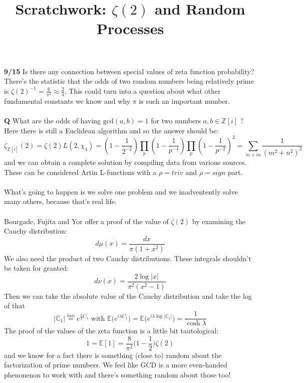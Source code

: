\documentclass[12pt]{article}
\title{Scratchwork: $\zeta(2)$ and Random Processes}
\date{}
\begin{document}
\sffamily

\maketitle

\noindent \textbf{9/15} Is there any connection between special values of zeta function probability?  There's the statistic that the odds of two random numbers being relatively prime is $\zeta(2)^{-1} = \frac{6}{\pi^2} \approx \frac{2}{3}$.  This could turn into a question about what other fundamental constants we know and why $\pi$ is such an important number. \\ \\
\textbf{Q} What are the odds of having $\text{gcd}(a,b) = 1$ for two numbers $a,b \in \mathbb{Z}[i]$ ?  Here there is still a Euclidean algorithm and so the answer should be:
$$ \zeta_{\mathbb{Z}[i]} (2) =  \zeta(2) L(2, \chi_4) = \left(1 - \frac{1}{2^{-2}} \right) \prod_p \left( 1 - \frac{1}{p^{-4}}\right) \prod_p \left( 1 - \frac{1}{p^{-2}} \right)^2
 = \sum_{m+in } \frac{1}{(m^2 + n^2)^2} $$
and we can obtain a complete solution by compiling data from various sources.  These can be considered Artin L-functions with a $\rho = triv$ and $\rho = sign$ part. \\ \\
What's going to happen is we solve one problem and we inadventently solve many others, because that's real life. \\ \\
Bourgade, Fujita and Yor offer a proof of the value of $\zeta(2)$ by examining the Cauchy distribution:
$$ d\mu(x) = \frac{dx}{\pi(1+x^2)} $$
We also need the product of two Cauchy distributions.  These integrals shouldn't be taken for granted:
$$ d\nu(x) = \frac{2 \log|x|}{\pi^2(x^2 - 1)} $$
Then we can take the absolute value of the Cauchy distribution and take the log of that
\begin{equation} |\mathbb{C}_1| \stackrel{law}{=} e^{\frac{\pi}{2}C_1} \text{ with }\mathbb{E}\big( e^{i\lambda C_1} \big) = 
\mathbb{E}\big( e^{i\lambda \log |\mathbb{C}_1|} \big) = \frac{1}{\cosh \lambda} \end{equation}
The proof of the values of the zeta function is a little bit tautological:
$$ 1 = \mathbb{E}[1] = \frac{8}{\pi^2} \big( 1 - \frac{1}{2}\big) \zeta(2) $$
and we know for a fact there is something (close to) random about the factorization of prime numbers.  We feel like GCD is a more even-handed phenonenon to work with and there's something random about those too!
\end{document}

